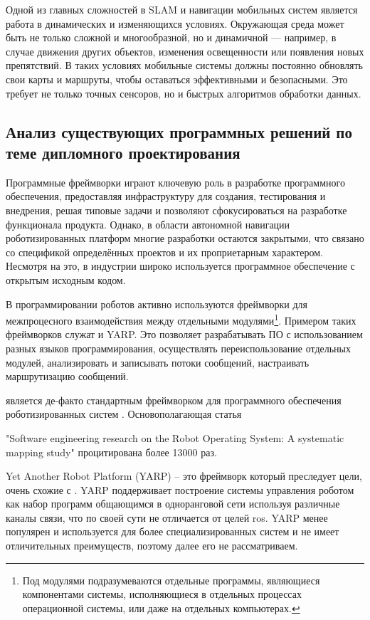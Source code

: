 Одной из главных сложностей в SLAM и навигации мобильных систем является работа
в динамических и изменяющихся условиях. Окружающая среда может быть не только
сложной и многообразной, но и динамичной — например, в случае движения других
объектов, изменения освещенности или появления новых препятствий. В таких
условиях мобильные системы должны постоянно обновлять свои карты и маршруты,
чтобы оставаться эффективными и безопасными. Это требует не только точных
сенсоров, но и быстрых алгоритмов обработки данных.

\subsection{Анализ существующих программных решений по теме дипломного
проектирования}

Программные фреймворки играют ключевую роль в разработке программного
обеспечения, предоставляя инфраструктуру для создания, тестирования и внедрения,
решая типовые задачи и позволяют сфокусироваться на разработке функционала
продукта. Однако, в области автономной навигации роботизированных платформ
многие разработки остаются закрытыми, что связано со спецификой определённых
проектов и их проприетарным характером. Несмотря на это, в индустрии широко
используется программное обеспечение с открытым исходным кодом.

В программировании роботов активно используются фреймворки для межпроцесного
взаимодействия между отдельными модулями\footnote{Под модулями подразумеваются
отдельные программы, являющиеся компонентами системы, исполняющиеся в отдельных
процессах операционной системы, или даже на отдельных компьютерах.}. Примером
таких фреймворков служат \ros{} и YARP.
Это позволяет разрабатывать ПО с использованием разных языков программирования,
осуществлять переиспользование отдельных модулей, анализировать и записывать
потоки сообщений, настраивать маршрутизацию сообщений.

\ros{} является де-факто стандартным фреймворком для программного обеспечения
роботизированных систем \cite{albonico2023software}. Основополагающая статья

"Software engineering research on the Robot Operating System: A systematic
mapping study"
\cite{quigley2009ros} процитирована более
\num{13000} раз.

Yet Another Robot Platform (YARP) \cite{metta2006yarp} -- это фреймворк который
преследует цели, очень схожие с \ros{}. YARP поддерживает построение системы
управления роботом как набор программ общающимся в одноранговой сети используя
различные каналы связи, что по своей сути не отличается от целей ros{}. YARP
менее популярен и используется для более специализированных систем и не имеет
отличительных преимуществ, поэтому далее его не рассматриваем.

